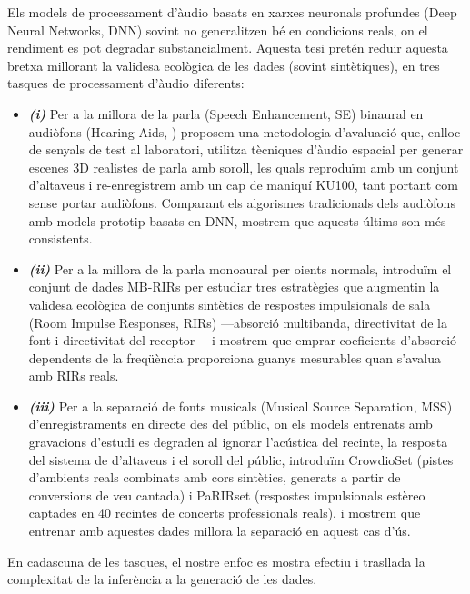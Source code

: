 Els models de processament d'àudio basats en xarxes neuronals profundes (Deep Neural Networks, \acrshort{DNN}) sovint no generalitzen bé en condicions reals, on el rendiment es pot degradar substancialment. Aquesta tesi pretén reduir aquesta bretxa millorant la validesa ecològica de les dades (sovint sintètiques), en tres tasques de processament d'àudio diferents:

\begin{itemize}

\item \textbf{\textit{(i)}} Per a la millora de la parla (Speech Enhancement, \acrshort{SE}) binaural en audiòfons (Hearing Aids, ) proposem una metodologia d'avaluació que, enlloc de senyals de test al laboratori, utilitza tècniques d'àudio espacial per generar escenes 3D realistes de parla amb soroll, les quals reproduïm amb un conjunt d'altaveus i re-enregistrem amb un cap de maniquí KU100, tant portant com sense portar audiòfons. Comparant els algorismes tradicionals dels audiòfons amb models prototip basats en DNN, mostrem que aquests últims son més consistents.

\item\textbf{\textit{(ii)}} Per a la millora de la parla monoaural per oients normals, introduïm el conjunt de dades MB-RIRs per estudiar tres estratègies que augmentin la validesa ecològica de conjunts sintètics de respostes impulsionals de sala (Room Impulse Responses, \acrshort{RIR}s) —absorció multibanda, directivitat de la font i directivitat del receptor— i mostrem que emprar coeficients d'absorció dependents de la freqüència proporciona guanys mesurables quan s'avalua amb RIRs reals.

\item \textbf{\textit{(iii)}} Per a la separació de fonts musicals (Musical Source Separation, \acrshort{MSS}) d'enregistraments en directe des del públic, on els models entrenats amb gravacions d'estudi es degraden al ignorar l'acústica del recinte, la resposta del sistema de d'altaveus i el soroll del públic, introduïm CrowdioSet (pistes d'ambients reals combinats amb cors sintètics, generats a partir de conversions de veu cantada) i PaRIRset (respostes impulsionals estèreo captades en 40 recintes de concerts professionals reals), i mostrem que entrenar amb aquestes dades millora la separació en aquest cas d'ús.

\end{itemize}
En cadascuna de les tasques, el nostre enfoc es mostra efectiu i trasllada la complexitat de la inferència a la generació de les dades.